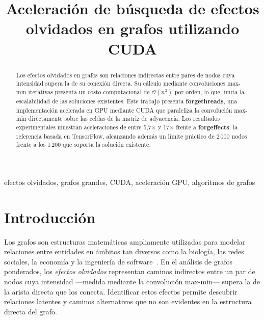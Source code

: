 \documentclass[conference]{IEEEtran}
\begin{document}
\title{Aceleración de búsqueda de efectos olvidados en grafos utilizando CUDA}

\author{
}

\maketitle

\begin{abstract}
Los efectos olvidados en grafos son relaciones indirectas entre pares de nodos cuya intensidad supera la de su conexión directa. Su cálculo mediante convoluciones max-min iterativas presenta un costo computacional de $\mathcal{O}(n^3)$ por orden, lo que limita la escalabilidad de las soluciones existentes. Este trabajo presenta \textbf{forgethreads}, una implementación acelerada en GPU mediante CUDA que paraleliza la convolución max-min directamente sobre las celdas de la matriz de adyacencia. Los resultados experimentales muestran aceleraciones de entre 5{,}7$\times$ y 17$\times$ frente a \textbf{forgeffects}, la referencia basada en TensorFlow, alcanzando además un límite práctico de 2\,000 nodos frente a los 1\,200 que soporta la solución existente.
\end{abstract}

\begin{IEEEkeywords}
efectos olvidados, grafos grandes, CUDA, aceleración GPU, algoritmos de grafos
\end{IEEEkeywords}

\section{Introducción}

Los grafos son estructuras matemáticas ampliamente utilizadas para modelar relaciones entre entidades en ámbitos tan diversos como la biología, las redes sociales, la economía y la ingeniería de software~\cite{forgotten_index}. En el análisis de grafos ponderados, los \textit{efectos olvidados} representan caminos indirectos entre un par de nodos cuya intensidad —medida mediante la convolución max-min— supera la de la arista directa que los conecta. Identificar estos efectos permite descubrir relaciones latentes y caminos alternativos que no son evidentes en la estructura directa del grafo.
\end{document}
